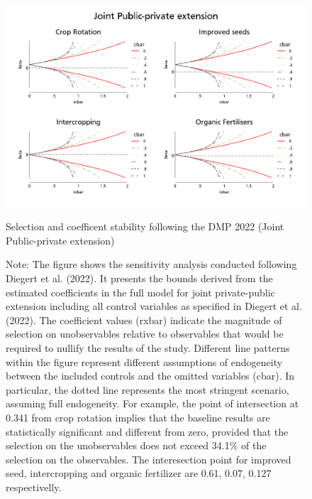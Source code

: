 \documentclass[
]{article}
\begin{document}
\begin{figure}[htbp]
\centering
\includegraphics[width=1\textwidth]{figures/combined_joint.png}
\caption{Selection and coefficent stability following the DMP 2022 (Joint Public-private extension)}
\caption*{Note: The figure shows the sensitivity analysis conducted following Diegert et al. (2022). It presents the bounds derived from the estimated coefficients in the full model for joint private-public extension including all control variables as specified in Diegert et al. (2022). The coefficient values (rxbar) indicate the magnitude of selection on unobservables relative to observables that would be required to nullify the results of the study. Different line patterns within the figure represent different assumptions of endogeneity between the included controls and the omitted variables (cbar). In particular, the dotted line represents the most stringent scenario, assuming full endogeneity. For example,  the point of intersection at 0.341 from crop rotation implies that the baseline results are statistically significant and different from zero, provided that the selection on the unobservables does not exceed 34.1\% of the selection on the observables. The interesection point for improved seed, intercropping and organic fertilizer are 0.61, 0.07, 0.127 respectivelly.}
\end{figure}

\pagebreak
\newpage

\begingroup\fontsize{7}{9}\selectfont
\end{document}
